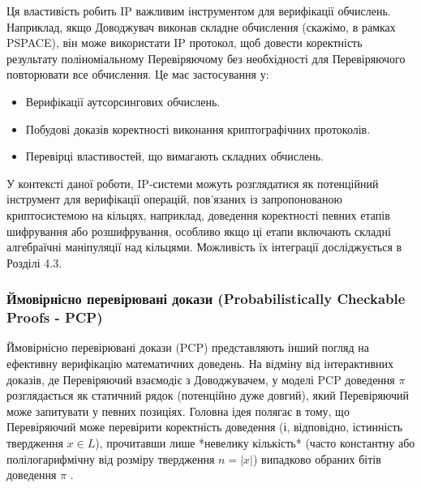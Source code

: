 \documentclass[a4paper,12pt]{article}
\begin{document}
    Ця властивість робить IP важливим інструментом для верифікації обчислень. Наприклад, якщо Доводжувач виконав складне обчислення (скажімо, в рамках PSPACE), він може використати IP протокол, щоб довести коректність результату поліноміальному Перевіряючому без необхідності для Перевіряючого повторювати все обчислення. Це має застосування у:
    \begin{itemize}
        \item Верифікації аутсорсингових обчислень.
        \item Побудові доказів коректності виконання криптографічних протоколів.
        \item Перевірці властивостей, що вимагають складних обчислень.
    \end{itemize}

    У контексті даної роботи, IP-системи можуть розглядатися як потенційний інструмент для верифікації операцій, пов'язаних із запропонованою криптосистемою на кільцях, наприклад, доведення коректності певних етапів шифрування або розшифрування, особливо якщо ці етапи включають складні алгебраїчні маніпуляції над кільцями. Можливість їх інтеграції досліджується в Розділі 4.3.

    \subsubsection{Ймовірнісно перевірювані докази (Probabilistically Checkable Proofs - PCP)} %

    Ймовірнісно перевірювані докази (PCP) представляють інший погляд на ефективну верифікацію математичних доведень. На відміну від інтерактивних доказів, де Перевіряючий взаємодіє з Доводжувачем, у моделі PCP доведення \(\pi\) розглядається як статичний рядок (потенційно дуже довгий), який Перевіряючий може запитувати у певних позиціях. Головна ідея полягає в тому, що Перевіряючий може перевірити коректність доведення (і, відповідно, істинність твердження \(x \in L\)), прочитавши лише *невелику кількість* (часто константну або полілогарифмічну від розміру твердження \(n = |x|\)) випадково обраних бітів доведення \(\pi\) \cite{arora1998probabilistic, arora1998proof}.
\end{document}
